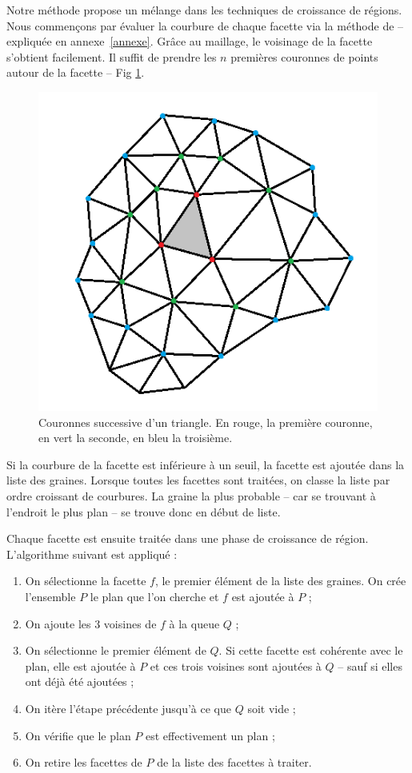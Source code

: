 ﻿\documentclass[12pt, twoside]{article}
\begin{document}
Notre méthode propose un mélange dans les techniques de croissance de régions. Nous commençons par évaluer la courbure de chaque facette via la méthode de \cite{reggrow3} -- expliquée en annexe~\ref{annexe}. Grâce au maillage, le voisinage de la facette s'obtient facilement. Il suffit de prendre les $n$ premières couronnes de points autour de la facette -- Fig \ref{fig:couronne}.

\begin{figure}[h]
\centering
\includegraphics[scale=0.5]{Couronnes.png}
\caption{\label{fig:couronne} Couronnes successive d'un triangle. En rouge, la première couronne, en vert la seconde, en bleu la troisième.}
\end{figure}

Si la courbure de la facette est inférieure à un seuil, la facette est ajoutée dans la liste des graines. Lorsque toutes les facettes sont traitées, on classe la liste par ordre croissant de courbures. La graine la plus probable -- car se trouvant à l'endroit le plus plan -- se trouve donc en début de liste.

Chaque facette est ensuite traitée dans une phase de croissance de région. L'algorithme suivant est appliqué :
\begin{enumerate}
  \item On sélectionne la facette $f$, le premier élément de la liste des graines. On crée l'ensemble $P$ le plan que l'on cherche et $f$ est ajoutée à $P$ ;
  \item On ajoute les 3 voisines de $f$ à la queue $Q$ ;
  \item On sélectionne le premier élément de $Q$. Si cette facette est cohérente avec le plan, elle est ajoutée à $P$ et ces trois voisines sont ajoutées à $Q$ -- sauf si elles ont déjà été ajoutées ;
  \item On itère l'étape précédente jusqu'à ce que $Q$ soit vide ;
  \item On vérifie que le plan $P$ est effectivement un plan ;
  \item On retire les facettes de $P$ de la liste des facettes à traiter.
\end{enumerate}
\end{document}
